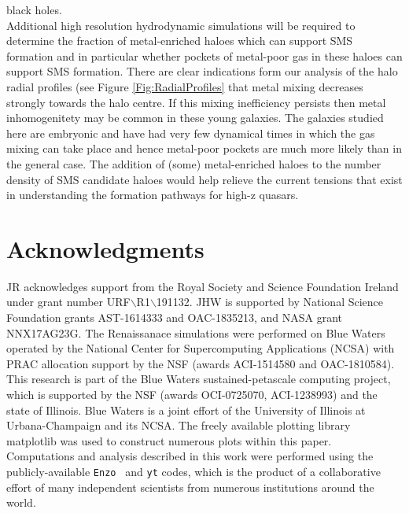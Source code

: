 \documentclass[graphics, twocolumn, usenatbib]{mn2e}
\newcommand{\enzo}{\texttt{Enzo~}}
\newcommand{\yt}{\texttt{yt}}
\begin{document}
black holes. \\
\indent Additional high resolution hydrodynamic simulations will be required to
determine the fraction of metal-enriched haloes which can support SMS formation and in particular
whether pockets of metal-poor gas in these haloes can support SMS formation. There are clear
indications form our analysis of the halo radial profiles (see Figure \ref{Fig:RadialProfiles} that
metal mixing decreases strongly towards the halo centre. If this mixing inefficiency persists
then metal inhomogenitety may be common in these young galaxies. The galaxies studied here are
embryonic and have had very few dynamical times in which the
gas mixing can take place and hence metal-poor pockets are much more likely than in the general case.
The addition of (some) metal-enriched haloes to the number density of SMS
candidate haloes would help relieve the current tensions that exist in understanding the formation
pathways for high-z quasars. 

\section*{Acknowledgments}

JR acknowledges support from the Royal Society and Science Foundation Ireland under
grant number URF$\backslash$R1$\backslash$191132.
JHW is supported by National Science Foundation grants AST-1614333 and
OAC-1835213, and NASA grant NNX17AG23G.  The Renaissanace simulations were performed on Blue
Waters operated by the National Center for Supercomputing Applications (NCSA)
with PRAC allocation support by the NSF (awards ACI-1514580 and OAC-1810584).
This research is part of the Blue Waters sustained-petascale computing project, which
is supported by the NSF (awards OCI-0725070, ACI-1238993) and the state of
Illinois. Blue Waters is a joint effort of the University of Illinois at
Urbana-Champaign and its NCSA.  The freely available plotting library {\sc
matplotlib} \citep{matplotlib} was used to construct numerous plots within this
paper. Computations and analysis described in this work were performed using the
publicly-available \enzo \citep{Enzo_2014, Enzo_2019} and \yt{} \citep{YT} codes, which is the product of a
collaborative effort of many independent scientists from numerous institutions
around the world.



\end{document}
